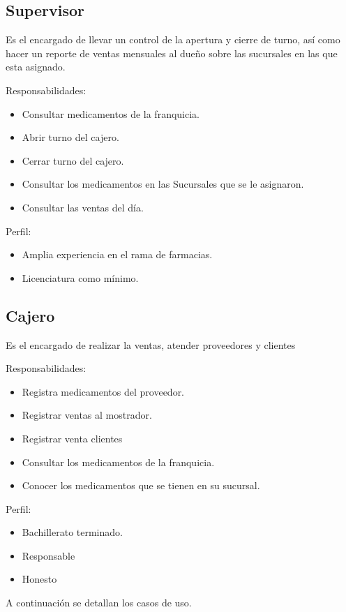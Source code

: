 \begin{Usuario}{\hypertarget{Supervisor}{\subsection{Supervisor}}}{
	Es el encargado de llevar un control de la apertura y cierre de turno,
	así como hacer un reporte de ventas mensuales al dueño sobre las sucursales en las que esta asignado.
}
    \item[Responsabilidades:] \cdtEmpty
    \begin{itemize}
    	\item Consultar medicamentos de la franquicia.
		\item Abrir turno del cajero.
		\item Cerrar turno del cajero.
		\item Consultar los medicamentos en las Sucursales que se le asignaron.
		\item Consultar las ventas del día.		
    \end{itemize}
    
	\item[Perfil:] \cdtEmpty
    \begin{itemize}
		\item Amplia experiencia en el rama de farmacias.
		\item Licenciatura como mínimo.
    \end{itemize}
\end{Usuario}

\begin{Usuario}{\hypertarget{Empleado}{\subsection{Cajero}}}{
	Es el encargado de realizar la ventas, atender proveedores y clientes
}
    \item[Responsabilidades:] \cdtEmpty
    \begin{itemize}
		\item Registra medicamentos del proveedor.
		\item Registrar ventas al mostrador.
		\item Registrar venta clientes
		\item Consultar los medicamentos de la franquicia.
		\item Conocer los medicamentos que se tienen en su sucursal.
    \end{itemize}

	\item[Perfil:] \cdtEmpty
    \begin{itemize}
		\item Bachillerato terminado.
		\item Responsable
		\item Honesto
    \end{itemize}
\end{Usuario}
A continuación se detallan los casos de uso.

